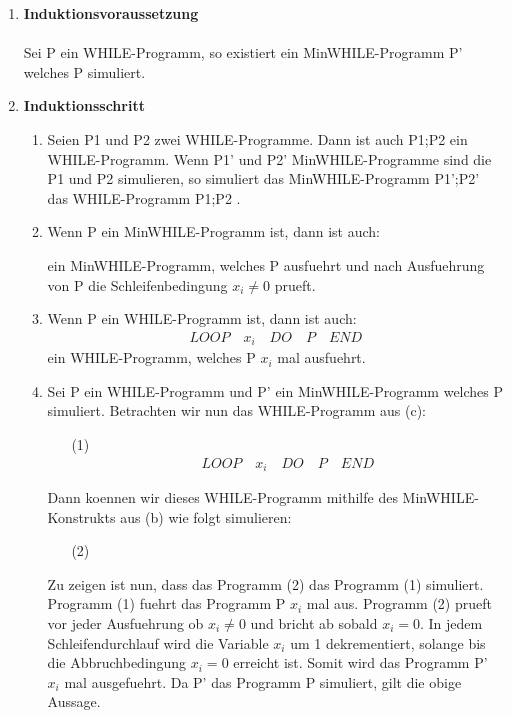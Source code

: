 \documentclass[a4paper,onecolumn,oneside,12pt,ngerman]{article}
\theoremstyle{plain} %
\theoremstyle{definition} %
\theoremstyle{remark} %
\theoremstyle{plain}
\begin{document}
\begin{enumerate}
	\item \textbf{Induktionsvoraussetzung}\\\\
	Sei P ein WHILE-Programm, so existiert ein MinWHILE-Programm P' welches P simuliert.
	\item \textbf{Induktionsschritt}
	\begin{enumerate}
	\item Seien P1 und P2 zwei WHILE-Programme. Dann ist auch P1;P2 ein WHILE-Programm. Wenn P1' und P2' MinWHILE-Programme sind die P1 und P2 simulieren, so simuliert das MinWHILE-Programm P1';P2' das WHILE-Programm P1;P2 .
	\item Wenn P ein MinWHILE-Programm ist, dann ist auch:\\
\begin{algorithm}[H]
\end{algorithm}
	ein MinWHILE-Programm, welches P ausfuehrt und nach Ausfuehrung von P die Schleifenbedingung $x_i \neq 0$ prueft.
	\item Wenn P ein WHILE-Programm ist, dann ist auch:\\
	\begin{align*}
		LOOP\quad x_i\quad DO\quad P\quad END
	\end{align*} 
	ein WHILE-Programm, welches P $x_i$ mal ausfuehrt.
	\item Sei P ein WHILE-Programm und P' ein MinWHILE-Programm welches P simuliert. Betrachten wir nun das WHILE-Programm aus (c):
	\begin{itemize}
	\item[(1)] \begin{align*}
			LOOP\quad x_i\quad DO\quad P\quad END
		\end{align*} 
	\end{itemize}
	Dann koennen wir dieses WHILE-Programm mithilfe des MinWHILE-Konstrukts aus (b) wie folgt simulieren:\\
	\begin{itemize}
	\item[(2)]	\begin{algorithm}[H]
		\end{algorithm}
	\end{itemize}
	Zu zeigen ist nun, dass das Programm (2) das Programm (1) simuliert. Programm (1) fuehrt das Programm P $x_i$ mal aus. Programm (2) prueft vor jeder Ausfuehrung ob $x_i \neq 0$ und bricht ab sobald $x_i = 0$. In jedem Schleifendurchlauf wird die Variable $x_i$ um 1 dekrementiert, solange bis die Abbruchbedingung $x_i = 0$ erreicht ist. Somit wird das Programm P' $x_i$ mal ausgefuehrt. Da P' das Programm P simuliert, gilt die obige Aussage.
	\end{enumerate}
\end{enumerate}
\end{document}

